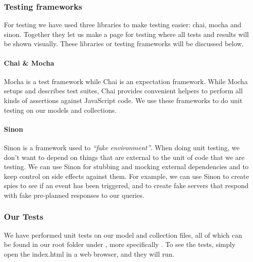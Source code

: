 \subsubsection{Testing frameworks}
For testing we have used three libraries to make testing easier: chai, mocha and sinon. Together they let us make a page for testing where all tests and results will be shown visually.
These libraries or testing frameworks will be discussed below.
\paragraph{Chai \& Mocha}
Mocha\cite{web_8} is a test framework while Chai\cite{web_7} is an expectation framework. While Mocha setups and describes test suites, Chai provides convenient helpers to perform all kinds of assertions against JavaScript code. We use these frameworks to do unit testing on our models and collections.

\paragraph{Sinon}
Sinon\cite{web_9} is a framework used to \textit{“fake environment”}. When doing unit testing, we don’t want to depend on things that are external to the unit of code that we are testing. We can use Sinon for stubbing and mocking external dependencies and to keep control on side effects against them. For example, we can use Sinon to create spies to see if an event has been triggered, and to create fake servers that respond with fake pre-planned responses to our queries.
\subsubsection{Our Tests}
We have performed unit tests on our model and collection files, all of which can be found in our root folder under , more specifically . To see the tests, simply open the index.html in a web browser, and they will run.
